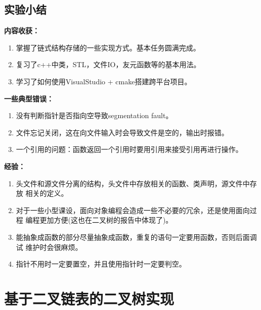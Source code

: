 \documentclass[supercite]{Experimental_Report}
\theoremstyle{definition}
\begin{document}
\subsection{实验小结}
    \noindent \textbf{内容收获：}
    \begin{enumerate}
    	\item 掌握了链式结构存储的一些实现方式。基本任务圆满完成。
    	\item 复习了c++中类，STL，文件IO，友元函数等的基本用法。
    	\item 学习了如何使用VisualStudio + cmake搭建跨平台项目。
    \end{enumerate}
	\noindent \textbf{一些典型错误：}
	\begin{enumerate}
		\item 没有判断指针是否指向空导致segmentation fault。
		\item 文件忘记关闭，这在向文件输入时会导致文件是空的，输出时报错。
		\item 一个引用的问题：函数返回一个引用时要用引用来接受引用再进行操作。
	\end{enumerate}
	\noindent \textbf{经验：}
	\begin{enumerate}
		\item 头文件和源文件分离的结构，头文件中存放相关的函数、类声明，源文件中存放
		相关的定义。
		\item 对于一些小型课设，面向对象编程会造成一些不必要的冗余，还是使用面向过程
		编程更加方便(这也在二叉树的报告中体现了)。
		\item 能抽象成函数的部分尽量抽象成函数，重复的语句一定要用函数，否则后面调试
		维护时会很麻烦。
		\item 指针不用时一定要置空，并且使用指针时一定要判空。
	\end{enumerate}


\newpage

\section{基于二叉链表的二叉树实现}
\end{document}

